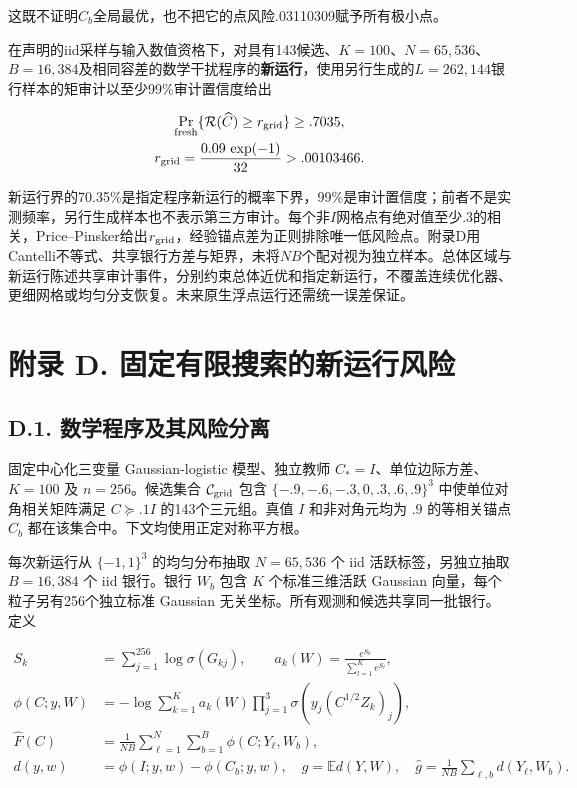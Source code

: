 \documentclass[11pt,a4paper]{article}
\begin{document}
这既不证明\(C_b\)全局最优，也不把它的点风险.03110309赋予所有极小点。

在声明的iid采样与输入数值资格下，对具有143候选、\(K=100\)、\(N=65{,}536\)、\(B=16{,}384\)及相同容差的数学干扰程序的\textbf{新运行}，使用另行生成的\(L=262{,}144\)银行样本的矩审计以至少99\%审计置信度给出

\[
\begin{gathered}
\Pr_{\rm fresh}\{\mathcal R(\widehat C)\ge r_{\rm grid}\}\ge .7035,\\
r_{\rm grid}=\frac{0.09\,\exp(-1)}{32}>.00103466.
\end{gathered}
\]

新运行界的70.35\%是指定程序新运行的概率下界，99\%是审计置信度；前者不是实测频率，另行生成样本也不表示第三方审计。每个非\(I\)网格点有绝对值至少.3的相关，Price--Pinsker给出\(r_{\rm grid}\)，经验锚点差为正则排除唯一低风险点。附录D用Cantelli不等式、共享银行方差与矩界，未将\(NB\)个配对视为独立样本。总体区域与新运行陈述共享审计事件，分别约束总体近优和指定新运行，不覆盖连续优化器、更细网格或均匀分支恢复。未来原生浮点运行还需统一误差保证。

\clearpage

\section*{附录 D.
固定有限搜索的新运行风险}\label{ux9644ux5f55-d.-ux56faux5b9aux6709ux9650ux641cux7d22ux7684ux65b0ux8fd0ux884cux98ceux9669}

\subsection*{D.1.
数学程序及其风险分离}\label{d.1.-ux6570ux5b66ux7a0bux5e8fux53caux5176ux98ceux9669ux5206ux79bb}

固定中心化三变量 Gaussian-logistic 模型、独立教师
\(C_*=I\)、单位边际方差、\(K=100\) 及 \(n=256\)。候选集合
\(\mathcal C_{\rm grid}\) 包含 \(\{-.9,-.6,-.3,0,.3,.6,.9\}^3\)
中使单位对角相关矩阵满足 \(C\succeq.1I\) 的143个三元组。真值 \(I\)
和非对角元均为 \(.9\) 的等相关锚点 \(C_b\)
都在该集合中。下文均使用正定对称平方根。

每次新运行从 \(\{-1,1\}^3\) 的均匀分布抽取 \(N=65,536\) 个 iid
活跃标签，另独立抽取 \(B=16,384\) 个 iid 银行。银行 \(W_b\) 包含 \(K\)
个标准三维活跃 Gaussian 向量，每个粒子另有256个独立标准 Gaussian
无关坐标。所有观测和候选共享同一批银行。定义

\[
\begin{aligned}
S_k&=\sum_{j=1}^{256}\log\sigma(G_{kj}),\qquad
a_k(W)=\frac{e^{S_k}}{\sum_{l=1}^{K}e^{S_l}},\\
\phi(C;y,W)&=-\log\sum_{k=1}^{K}a_k(W)
 \prod_{j=1}^{3}\sigma\!\left(y_j(C^{1/2}Z_k)_j\right),\\
\widehat F(C)&=\frac1{NB}\sum_{\ell=1}^{N}\sum_{b=1}^{B}\phi(C;Y_\ell,W_b),\\
d(y,w)&=\phi(I;y,w)-\phi(C_b;y,w),\quad
g=\mathbb E d(Y,W),\quad
\widehat g=\frac1{NB}\sum_{\ell,b}d(Y_\ell,W_b).
\end{aligned}
\tag{D.1}
\]
\end{document}

